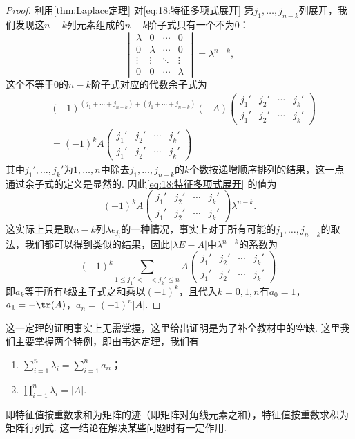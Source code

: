 \begin{proof}
    利用\autoref{thm:Laplace定理} 对\autoref{eq:18:特征多项式展开} 第$j_1,\ldots,j_{n-k}$列展开，我们发现这$n-k$列元素组成的$n-k$阶子式只有一个不为0：
    \[\begin{vmatrix}
            \lambda & 0       & \cdots & 0       \\
            0       & \lambda & \cdots & 0       \\
            \vdots  & \vdots  & \ddots & \vdots  \\
            0       & 0       & \cdots & \lambda
        \end{vmatrix}=\lambda^{n-k},\]
    这个不等于0的$n-k$阶子式对应的代数余子式为
    \begin{align*}
         & (-1)^{(j_1+\cdots+j_{n-k})+(j_1+\cdots+j_{n-k})}(-A)
        \begin{pmatrix}
            j_1' & j_2' & \cdots & j_k' \\
            j_1' & j_2' & \cdots & j_k'
        \end{pmatrix}                             \\
         & = (-1)^kA\begin{pmatrix}
                        j_1' & j_2' & \cdots & j_k' \\
                        j_1' & j_2' & \cdots & j_k'
                    \end{pmatrix}
    \end{align*}
    其中$j_1',\ldots,j_k'$为$1,\ldots,n$中除去$j_1,\ldots,j_{n-k}$的$k$个数按递增顺序排列的结果，这一点通过余子式的定义是显然的. 因此\autoref{eq:18:特征多项式展开} 的值为
    \[(-1)^kA\begin{pmatrix}
            j_1' & j_2' & \cdots & j_k' \\
            j_1' & j_2' & \cdots & j_k'
        \end{pmatrix}\lambda^{n-k}.\]
    这实际上只是取$n-k$列$\lambda e_{j_i}$的一种情况，事实上对于所有可能的$j_1,\ldots,j_{n-k}$的取法，我们都可以得到类似的结果，因此$|\lambda E-A|$中$\lambda^{n-k}$的系数为
    \[(-1)^k\sum\limits_{1\leqslant j_1'<\cdots<j_k'\leqslant n}A\begin{pmatrix}
            j_1' & j_2' & \cdots & j_k' \\
            j_1' & j_2' & \cdots & j_k'
        \end{pmatrix}.\]
    即$a_k$等于所有$k$级主子式之和乘以$(-1)^k$，且代入$k=0,1,n$有$a_0=1$，$a_1=-\tr(A)$，$a_n=(-1)^n|A|$.
\end{proof}

这一定理的证明事实上无需掌握，这里给出证明是为了补全教材中的空缺. 这里我们主要掌握两个特例，即由韦达定理，我们有
\begin{enumerate}
    \item $\displaystyle\sum_{i=1}^{n}\lambda_i=\displaystyle\sum_{i=1}^{n}a_{ii}$；

    \item $\displaystyle\prod_{i=1}^{n}\lambda_i=|A|$.
\end{enumerate}
即特征值按重数求和为矩阵的迹（即矩阵对角线元素之和），特征值按重数求积为矩阵行列式. 这一结论在解决某些问题时有一定作用.

